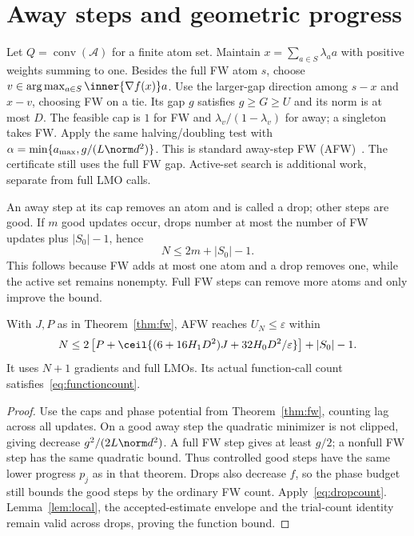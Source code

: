 \section{Away steps and geometric progress}
Let $Q=\operatorname{conv}(\mathcal A)$ for a finite atom set.
Maintain $x=\sum_{a\in S}\lambda_a a$ with positive weights summing
to one. Besides the full FW atom $s$, choose
$v\in\arg\max_{a\in S}\inner{\nabla f(x)}a$.
Use the larger-gap direction among $s-x$ and $x-v$, choosing FW on a
tie. Its gap $g$ satisfies $g\ge G\ge U$ and its norm is at most $D$.
The feasible cap is $1$ for FW and $\lambda_v/(1-\lambda_v)$ for
away; a singleton takes FW. Apply the same halving/doubling test with
$\alpha=\min\{a_{\max},g/(L\norm d^2)\}$.
This is standard away-step FW (AFW)~\cite{lacostejaggi,pedregosa}.
The certificate still uses the full FW gap. Active-set search is
additional work, separate from full LMO calls.

An away step at its cap removes an atom and is called a drop;
other steps are good. If $m$ good updates occur, drops number at most
the number of FW updates plus $|S_0|-1$, hence
\begin{equation}\label{eq:dropcount}
 N\le2m+|S_0|-1.
\end{equation}
This follows because FW adds at most one atom and a drop removes one,
while the active set remains nonempty. Full FW steps can remove more
atoms and only improve the bound.

\begin{theorem}\label{thm:afw}
With $J,P$ as in Theorem~\ref{thm:fw}, AFW reaches
$U_N\le\varepsilon$ within
\[
 N\le2\left[P+\ceil{(6+16H_1D^2)J+32H_0D^2/\varepsilon}\right]
       +|S_0|-1.
\]
It uses $N+1$ gradients and full LMOs.
Its actual function-call count satisfies~\eqref{eq:functioncount}.
\end{theorem}
\begin{proof}
Use the caps and phase potential from Theorem~\ref{thm:fw}, counting
lag across all updates. On a good away step the quadratic minimizer
is not clipped, giving decrease $g^2/(2L\norm d^2)$.
A full FW step gives at least $g/2$; a nonfull FW step has the same
quadratic bound. Thus controlled good steps have the same lower
progress $p_j$ as in that theorem. Drops also decrease $f$, so the
phase budget still bounds the good steps by the ordinary FW count.
Apply~\eqref{eq:dropcount}. Lemma~\ref{lem:local}, the accepted-estimate
envelope and the trial-count identity remain valid across drops,
proving the function bound.
\end{proof}

